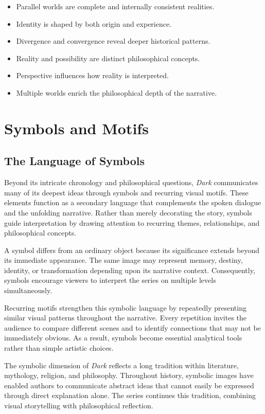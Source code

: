 \documentclass[12pt,oneside,openany]{book}
\begin{document}
\begin{tcolorbox}[colback=orange!8,colframe=orange!70!black,title=Chapter Takeaways]
\begin{itemize}
\item Parallel worlds are complete and internally consistent realities.
\item Identity is shaped by both origin and experience.
\item Divergence and convergence reveal deeper historical patterns.
\item Reality and possibility are distinct philosophical concepts.
\item Perspective influences how reality is interpreted.
\item Multiple worlds enrich the philosophical depth of the narrative.
\end{itemize}
\end{tcolorbox}
\chapter{Symbols and Motifs}
\section{The Language of Symbols}

Beyond its intricate chronology and philosophical questions, \textit{Dark}
communicates many of its deepest ideas through symbols and recurring visual
motifs. These elements function as a secondary language that complements the
spoken dialogue and the unfolding narrative. Rather than merely decorating the
story, symbols guide interpretation by drawing attention to recurring themes,
relationships, and philosophical concepts.

A symbol differs from an ordinary object because its significance extends
beyond its immediate appearance. The same image may represent memory, destiny,
identity, or transformation depending upon its narrative context. Consequently,
symbols encourage viewers to interpret the series on multiple levels
simultaneously.

Recurring motifs strengthen this symbolic language by repeatedly presenting
similar visual patterns throughout the narrative. Every repetition invites the
audience to compare different scenes and to identify connections that may not
be immediately obvious. As a result, symbols become essential analytical tools
rather than simple artistic choices.

The symbolic dimension of \textit{Dark} reflects a long tradition within
literature, mythology, religion, and philosophy. Throughout history, symbolic
images have enabled authors to communicate abstract ideas that cannot easily be
expressed through direct explanation alone. The series continues this
tradition, combining visual storytelling with philosophical reflection.
\end{document}
